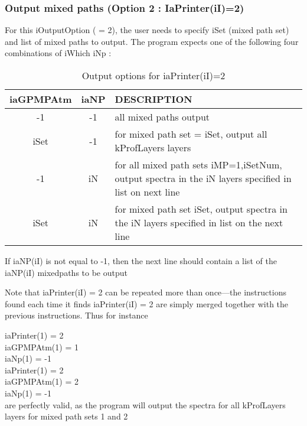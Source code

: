 \documentclass[12pt]{article}
\newcommand{\ttab}{\indent\indent}
\newlength{\colwidth}
\begin{document}
{{\subsubsection{Output mixed paths (Option 2 : IaPrinter(iI)=2)}

\vspace{0.1in}
\noindent For this iOutputOption ( = 2), the user needs to specify iSet 
(mixed path set) and list of mixed paths to output. The program expects one 
of the following four combinations of {\sf iWhich iNp} : \\

\vspace{0.2in}
\begin{small}
\begin{longtable}{|c|c|p{\colwidth}|}
\caption{Output options for iaPrinter(iI)=2}\\
\hline
iaGPMPAtm& iaNP & DESCRIPTION\\ \hline
-1   &  -1   & all mixed paths output\\ \hline
iSet &  -1   & for mixed path set = iSet, output all kProfLayers layers\\ 
               \hline
-1   & iN    & for all mixed path sets iMP=1,iSetNum,  output spectra in 
               the iN layers specified in list on next line\\ \hline
iSet & iN    & for mixed path set iSet, output spectra in the
              iN layers specified in list on the next line\\ \hline
\end{longtable}
\end{small}
If iaNP(iI) is not equal to -1, then the next line should contain a 
list of the iaNP(iI) mixedpaths to be output

Note that iaPrinter(iI) = 2 can be repeated more than once---the 
instructions found each time it finds iaPrinter(iI) =  2 are simply merged
together with the previous instructions.  Thus for instance

\medskip
\ttab iaPrinter(1) = 2\\
\ttab iaGPMPAtm(1) = 1\\
\ttab iaNp(1)      = -1\\
\ttab iaPrinter(1) = 2\\
\ttab iaGPMPAtm(1) = 2\\
\ttab iaNp(1)      = -1\\

\medskip
\noindent
are perfectly valid, as the program will output the spectra for all
kProfLayers layers for mixed path sets 1 and 2

}}
\end{document}
